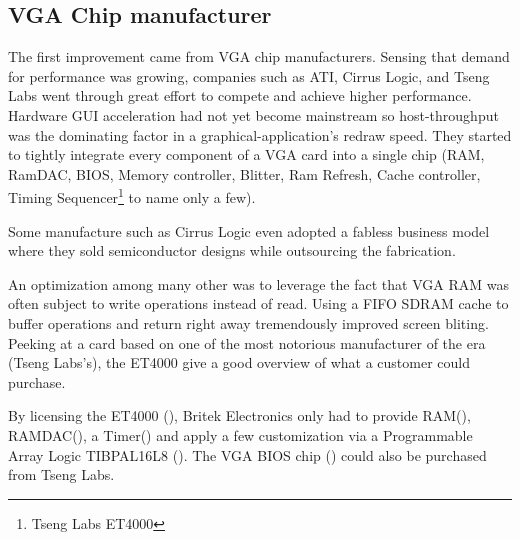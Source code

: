 \subsection{VGA Chip manufacturer}
The first improvement came from VGA chip manufacturers. Sensing that demand for performance was growing, companies such as ATI, Cirrus Logic, and Tseng Labs went through great effort to compete and achieve higher performance. Hardware GUI acceleration had not yet become mainstream so host-throughput was the dominating factor in a graphical-application's redraw speed. They started to tightly integrate every component of a VGA card into a single chip (RAM, RamDAC, BIOS, Memory controller, Blitter, Ram Refresh, Cache controller, Timing Sequencer\footnote{Tseng Labs ET4000} to name only a few).\\
\par
Some manufacture such as Cirrus Logic even adopted a fabless business model where they sold semiconductor designs while outsourcing the fabrication.


An optimization among many other was to leverage the fact that VGA RAM was often subject to write operations instead of read. Using a FIFO SDRAM cache to buffer operations and return right away tremendously improved screen bliting. Peeking at a card based on one of the most notorious manufacturer of the era (Tseng Labs's), the ET4000 give a good overview of what a customer could purchase.\\ 
\par
{}
\par
By licensing the ET4000 (), Britek Electronics only had to provide RAM(), RAMDAC(), a Timer() and apply a few customization via a Programmable Array Logic TIBPAL16L8 (). The VGA BIOS chip () could also be purchased from Tseng Labs.\\
\par
\vspace{10pt}

\par



